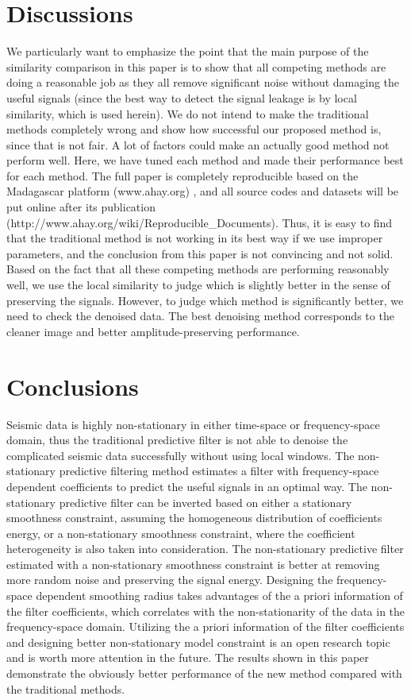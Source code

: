 \section{Discussions}
We particularly want to emphasize the point that the main purpose of the similarity comparison in this paper is to show that all competing methods are doing a reasonable job as they all remove significant noise without damaging the useful signals (since the best way to detect the signal leakage is by local similarity, which is used herein). We do not intend to make the traditional methods completely wrong and show how successful our proposed method is, since that is not fair. A lot of factors could make an actually good method not perform well. Here, we have tuned each method and made their performance best for each method. The full paper is completely reproducible based on the Madagascar platform (www.ahay.org) \cite{mada2013}, and all source codes and datasets will be put online after its publication (http://www.ahay.org/wiki/Reproducible\_Documents). Thus, it is easy to find that the traditional method is not working in its best way if we use improper parameters, and the conclusion from this paper is not convincing and not solid. Based on the fact that all these competing methods are performing reasonably well, we use the local similarity to judge which is slightly better in the sense of preserving the signals. However, to judge which method is significantly better, we need to check the denoised data. The best denoising method corresponds to the cleaner image and better amplitude-preserving performance.

\section{Conclusions}
Seismic data is highly non-stationary in either time-space or frequency-space domain, thus the traditional predictive filter is not able to denoise the complicated seismic data successfully without using local windows. The non-stationary predictive filtering method estimates a filter with frequency-space dependent coefficients to predict the useful signals in an optimal way. The non-stationary predictive filter can be inverted based on either a stationary smoothness constraint, assuming the homogeneous distribution of coefficients energy, or a non-stationary smoothness constraint, where the coefficient heterogeneity is also taken into consideration.  The non-stationary predictive filter estimated with a non-stationary smoothness constraint is better at removing more random noise and preserving the signal energy. Designing the frequency-space dependent smoothing radius takes advantages of the a priori information of the filter coefficients, which correlates with the non-stationarity of the data in the frequency-space domain. Utilizing the a priori information of the filter coefficients and designing  better non-stationary model constraint is an open research topic and is worth more attention in the future. The results shown in this paper demonstrate the obviously better performance of the new method compared with the traditional methods.

